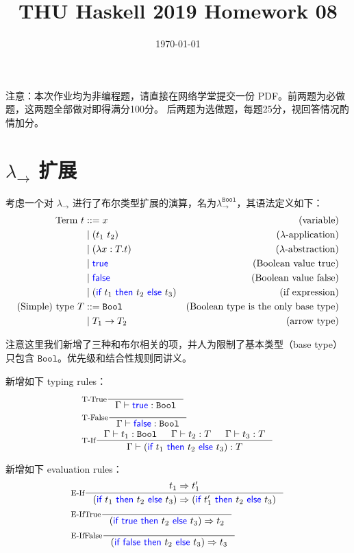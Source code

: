 \documentclass[11pt, a4paper]{article}
\title{\textbf{THU Haskell 2019 Homework 08}}
\author{}
\date{\today}
\newcommand{\hei}{\CJKfamily{hei}}
\let\t\texttt
\let\to\rightarrow
\let\reduce\Rightarrow
\newcommand{\Bool}{\t{Bool}}
\newcommand{\kword}[1]{{\color{blue} \textsf{#1}}}
\newcommand{\True}{\kword{true}}
\newcommand{\False}{\kword{false}}
\newcommand{\If}{\kword{if}}
\newcommand{\Then}{\kword{then}}
\newcommand{\Else}{\kword{else}}
\begin{document}
\maketitle

{\hei 注意：本次作业均为非编程题，请直接在网络学堂提交一份 PDF。前两题为必做题，这两题全部做对即得满分100分。
后两题为选做题，每题25分，视回答情况酌情加分。}

\section{$\lambda_\to$ 扩展}

考虑一个对 $\lambda_\to$ 进行了布尔类型扩展的演算，名为$\lambda_\to^{\Bool}$，其语法定义如下：
\begin{align*}
    \text{Term}~t &::= x & \text{(variable)} \\
    &\mid (t_1~t_2) & \text{($\lambda$-application)} \\
    &\mid (\lambda x:T.t) & \text{($\lambda$-abstraction)} \\
    &\mid \True & \text{(Boolean value true)} \\
    &\mid \False & \text{(Boolean value false)} \\
    &\mid (\If~t_1~\Then~t_2~\Else~t_3) & \text{(if expression)} \\
    \text{(Simple) type}~T &::= \Bool & \text{(Boolean type is the only base type)} \\
    &\mid T_1\to T_2 & \text{(arrow type)}
\end{align*}

注意这里我们新增了三种和布尔相关的项，并人为限制了基本类型（base type）只包含 $\Bool$。优先级和结合性规则同讲义。

新增如下 typing rules：
\begin{align*}
    & \inference[T-True]{}{\Gamma \vdash \True:\Bool} \\
    & \inference[T-False]{}{\Gamma \vdash \False:\Bool} \\
    & \inference[T-If]{\Gamma \vdash t_1:\Bool & \Gamma \vdash t_2:T & \Gamma \vdash t_3:T}{\Gamma \vdash (\If~t_1~\Then~t_2~\Else~t_3):T}
\end{align*}

新增如下 evaluation rules：
\begin{align*}
    &\inference[E-If]{t_1 \reduce t_1'}{(\If~t_1~\Then~t_2~\Else~t_3) \reduce (\If~t_1'~\Then~t_2~\Else~t_3)} \\
    &\inference[E-IfTrue]{}{(\If~\True~\Then~t_2~\Else~t_3) \reduce t_2} \\
    &\inference[E-IfFalse]{}{(\If~\False~\Then~t_2~\Else~t_3) \reduce t_3}
\end{align*}
\end{document}
